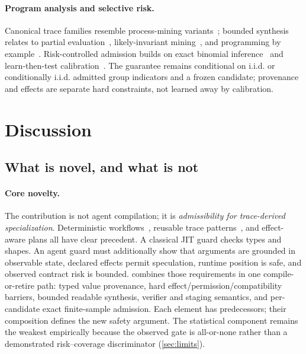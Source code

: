 \paragraph{Program analysis and selective risk.}
Canonical trace families resemble process-mining variants~\cite{vanderAalst2016process};
bounded synthesis relates to partial evaluation~\cite{jones1993partial}, likely-invariant
mining~\cite{ernst2001daikon}, and programming by example~\cite{gulwani2011flashfill}.
Risk-controlled admission builds on exact binomial inference~\cite{clopper1934binomial}
and learn-then-test calibration~\cite{angelopoulos2022ltt}.  The guarantee remains
conditional on i.i.d. or conditionally i.i.d. admitted group indicators and a frozen
candidate; provenance and effects are separate hard constraints, not learned away by
calibration.

\section{Discussion}

\subsection{What is novel, and what is not}

\paragraph{Core novelty.}
The contribution is not agent compilation; it is \emph{admissibility for trace-derived
specialization}. Deterministic workflows~\cite{chundru2026agenticcompilation}, reusable
trace patterns~\cite{wang2025awm,abuzakuk2026awo}, and effect-aware plans all have clear
precedent. A classical JIT guard checks types and shapes. An agent guard must additionally
show that arguments are grounded in observable state, declared effects permit speculation,
runtime position is safe, and observed contract risk is bounded. \method combines those
requirements in one compile-or-retire path: typed value provenance, hard
effect/permission/compatibility barriers, bounded readable synthesis, verifier and staging
semantics, and per-candidate exact finite-sample admission. Each element has predecessors; their
composition defines the new safety argument. The statistical component remains the
weakest empirically because the observed gate is all-or-none rather than a demonstrated
risk--coverage discriminator (\cref{sec:limits}).

